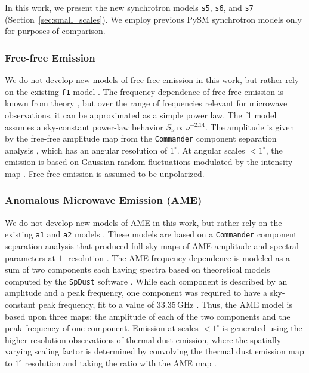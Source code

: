 \documentclass[twocolumn]{aastex631}
\begin{document}
In this work, we present the new synchrotron models \texttt{s5}, \texttt{s6}, and \texttt{s7} (Section~\ref{sec:small_scales}). We employ previous PySM synchrotron models only for purposes of comparison.

\subsubsection{Free-free Emission}
We do not develop new models of free-free emission in this work, but rather rely on the existing \texttt{f1} model \citep{Thorne:2017}. The frequency dependence of free-free emission is known from theory \citep[][and references therein]{Draine:2011}, but over the range of frequencies relevant for microwave observations, it can be approximated as a simple power law. The f1 model assumes a sky-constant power-law behavior $S_\nu \propto \nu^{-2.14}$. The amplitude is given by the free-free amplitude map from the \texttt{Commander} component separation analysis \citep{planck2014-a12}, which has an angular resolution of $1^\circ$. At angular scales $<1^\circ$, the emission is based on Gaussian random fluctuations modulated by the intensity map \citep[see][for details]{Thorne:2017}. Free-free emission is assumed to be unpolarized.

\subsubsection{Anomalous Microwave Emission (AME)}
We do not develop new models of AME in this work, but rather rely on the existing \texttt{a1} and \texttt{a2} models \citep{Thorne:2017}. These models are based on a \texttt{Commander} component separation analysis that produced full-sky maps of AME amplitude and spectral parameters at $1^\circ$ resolution \citep{planck2014-a12}. The AME frequency dependence is modeled as a sum of two components each having spectra based on theoretical models computed by the \texttt{SpDust} software \citep{Ali-Haimoud:2009, Silsbee:2011}. While each component is described by an amplitude and a peak frequency, one component was required to have a sky-constant peak frequency, fit to a value of 33.35\,GHz \citep{planck2014-a12}. Thus, the AME model is based upon three maps: the amplitude of each of the two components and the peak frequency of one component. Emission at scales $<1^\circ$ is generated using the higher-resolution observations of thermal dust emission, where the spatially varying scaling factor is determined by convolving the thermal dust emission map to $1^\circ$ resolution and taking the ratio with the AME map \citep{Thorne:2017}.
\end{document}
